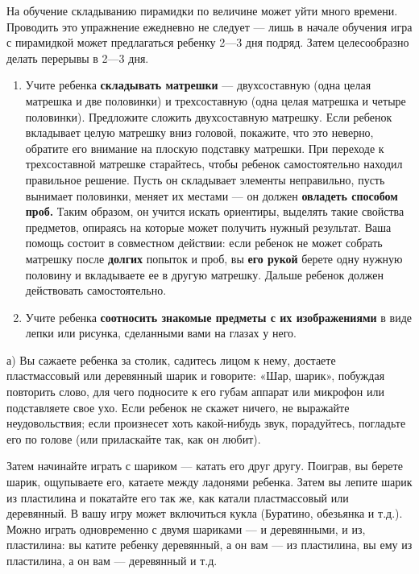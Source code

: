 \documentclass[a5paper]{book}
\begin{document}
На обучение складыванию пирамидки по величине может уйти много времени.
Проводить это упражнение ежедневно не следует --- лишь в начале обучения
игра с пирамидкой может предлагаться ребенку 2---3 дня подряд. Затем
целесообразно делать перерывы в 2---3 дня.


\begin{enumerate}
\def\labelenumi{\arabic{enumi}.}
\setcounter{enumi}{1}
\item
  
  Учите ребенка \textbf{складывать матрешки} --- двухсоставную (одна
  целая матрешка и две половинки) и трехсоставную (одна целая матрешка и
  четыре половинки). Предложите сложить двухсоставную матрешку. Если
  ребенок вкладывает целую матрешку вниз головой, покажите, что это
  неверно, обратите его внимание на плоскую подставку матрешки. При
  переходе к трехсоставной матрешке старайтесь, чтобы ребенок
  самостоятельно находил правильное решение. Пусть он складывает
  элементы неправильно, пусть вынимает половинки, меняет их местами ---
  он должен \textbf{овладеть способом проб.} Таким образом, он учится
  искать ориентиры, выделять такие свойства предметов, опираясь на
  которые может получить нужный результат. Ваша помощь состоит в
  совместном действии: если ребенок не может собрать матрешку после
  \textbf{долгих} попыток и проб, вы \textbf{его рукой} берете одну
  нужную половину и вкладываете ее в другую матрешку. Дальше ребенок
  должен действовать самостоятельно.
  
\item
  
  Учите ребенка \textbf{соотносить знакомые предметы с их изображениями}
  в виде лепки или рисунка, сделанными вами на глазах у него.
  
\end{enumerate}


а) Вы сажаете ребенка за столик, садитесь лицом к нему, достаете
пластмассовый или деревянный шарик и говорите: «Шар, шарик», побуждая
повторить слово, для чего подносите к его губам аппарат или микрофон или
подставляете свое ухо. Если ребенок не скажет ничего, не выражайте
неудовольствия; если произнесет хоть какой-нибудь звук, порадуйтесь,
погладьте его по голове (или приласкайте так, как он любит).

Затем начинайте играть с шариком --- катать его друг другу. Поиграв, вы
берете шарик, ощупываете его, катаете между ладонями ребенка. Затем вы
лепите шарик из пластилина и покатайте его так же, как катали
пластмассовый или деревянный. В вашу игру может включиться кукла
(Буратино, обезьянка и т.д.). Можно играть одновременно с двумя шариками
--- и деревянными, и из, пластилина: вы катите ребенку деревянный, а он
вам --- из пластилина, вы ему из пластилина, а он вам --- деревянный и
т.д.
\end{document}
